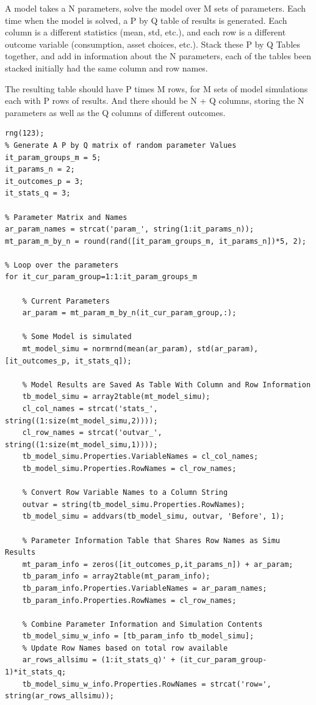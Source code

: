 \documentclass[
]{book}
\begin{document}
A model takes a N parameters, solve the model over M sets of parameters.
Each time when the model is solved, a P by Q table of results is
generated. Each column is a different statistics (mean, std, etc.), and
each row is a different outcome variable (consumption, asset choices,
etc.). Stack these P by Q Tables together, and add in information about
the N parameters, each of the tables been stacked initially had the same
column and row names.

The resulting table should have P times M rows, for M sets of model
simulations each with P rows of results. And there should be N + Q
columns, storing the N parameters as well as the Q columns of different
outcomes.

\begin{verbatim}
rng(123);
% Generate A P by Q matrix of random parameter Values
it_param_groups_m = 5; 
it_params_n = 2;
it_outcomes_p = 3;
it_stats_q = 3;

% Parameter Matrix and Names
ar_param_names = strcat('param_', string(1:it_params_n));
mt_param_m_by_n = round(rand([it_param_groups_m, it_params_n])*5, 2);

% Loop over the parameters
for it_cur_param_group=1:1:it_param_groups_m
    
    % Current Parameters
    ar_param = mt_param_m_by_n(it_cur_param_group,:);
    
    % Some Model is simulated
    mt_model_simu = normrnd(mean(ar_param), std(ar_param), [it_outcomes_p, it_stats_q]);
    
    % Model Results are Saved As Table With Column and Row Information
    tb_model_simu = array2table(mt_model_simu);
    cl_col_names = strcat('stats_', string((1:size(mt_model_simu,2))));
    cl_row_names = strcat('outvar_', string((1:size(mt_model_simu,1))));
    tb_model_simu.Properties.VariableNames = cl_col_names;
    tb_model_simu.Properties.RowNames = cl_row_names;    
        
    % Convert Row Variable Names to a Column String
    outvar = string(tb_model_simu.Properties.RowNames);
    tb_model_simu = addvars(tb_model_simu, outvar, 'Before', 1);
    
    % Parameter Information Table that Shares Row Names as Simu Results
    mt_param_info = zeros([it_outcomes_p,it_params_n]) + ar_param;
    tb_param_info = array2table(mt_param_info);
    tb_param_info.Properties.VariableNames = ar_param_names;
    tb_param_info.Properties.RowNames = cl_row_names;
    
    % Combine Parameter Information and Simulation Contents
    tb_model_simu_w_info = [tb_param_info tb_model_simu];
    % Update Row Names based on total row available
    ar_rows_allsimu = (1:it_stats_q)' + (it_cur_param_group-1)*it_stats_q;
    tb_model_simu_w_info.Properties.RowNames = strcat('row=', string(ar_rows_allsimu));
    

\end{verbatim}
\end{document}
